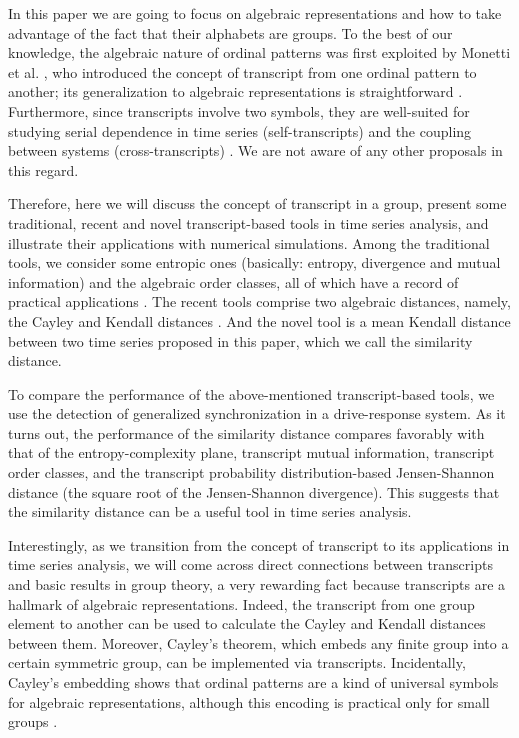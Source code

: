 \documentclass[%
 aip,
 amsmath,amssymb,
 reprint,%
]{revtex4-1}
\begin{document}
In this paper we are going to focus on algebraic representations and how to
take advantage of the fact that their alphabets are groups. To the best of
our knowledge, the algebraic nature of ordinal patterns was first exploited
by Monetti et al. \cite{Monetti2009}, who introduced the concept of
transcript from one ordinal pattern to another; its generalization to
algebraic representations is straightforward \cite{Amigo2016}. Furthermore,
since transcripts involve two symbols, they are well-suited for studying
serial dependence in time series (self-transcripts) and the coupling between
systems (cross-transcripts) \cite{Amigo2012}. We are not aware of any other
proposals in this regard.

Therefore, here we will discuss the concept of transcript in a group,
present some traditional, recent and novel transcript-based tools in time
series analysis, and illustrate their applications with numerical
simulations. Among the traditional tools, we consider some entropic ones
(basically: entropy, divergence and mutual information) and the algebraic
order classes, all of which have a record of practical applications \cite%
{Monetti2009,Amigo2012}. The recent tools comprise two algebraic distances,
namely, the Cayley and Kendall distances \cite{Amigo2025}. And the novel
tool is a mean Kendall distance between two time series proposed in this
paper, which we call the similarity distance.

To compare the performance of the above-mentioned transcript-based tools, we use the detection of generalized synchronization
in a drive-response system. As it turns out, the performance of the
similarity distance compares favorably with that of the entropy-complexity
plane, transcript mutual information, transcript order classes, and the
transcript probability distribution-based Jensen-Shannon distance (the
square root of the Jensen-Shannon divergence). This suggests that the
similarity distance can be a useful tool in time series analysis.

Interestingly, as we transition from the concept of transcript to its
applications in time series analysis, we will come across direct connections
between transcripts and basic results in group theory, a very rewarding fact
because transcripts are a hallmark of algebraic representations. Indeed, the
transcript from one group element to another can be used to calculate the
Cayley and Kendall distances between them. Moreover, Cayley's theorem, which
embeds any finite group into a certain symmetric group, can be implemented
via transcripts. Incidentally, Cayley's embedding shows that ordinal
patterns are a kind of universal symbols for algebraic representations,
although this encoding is practical only for small groups \cite{Amigo2025}.
\end{document}
